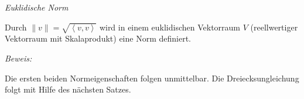 
\begin{mysatz}\label{euklidischeNorm} \textit{Euklidische Norm}

    Durch $\| v \| = \sqrt{\left\langle v, v \right\rangle}$ wird in einem euklidischen Vektorraum $V$ (reellwertiger Vektorraum mit Skalaprodukt) eine Norm definiert.

\textit{Beweis:}

    Die ersten beiden Normeigenschaften folgen unmittelbar. Die Dreiecksungleichung folgt mit Hilfe des nächsten Satzes.
\end{mysatz}

